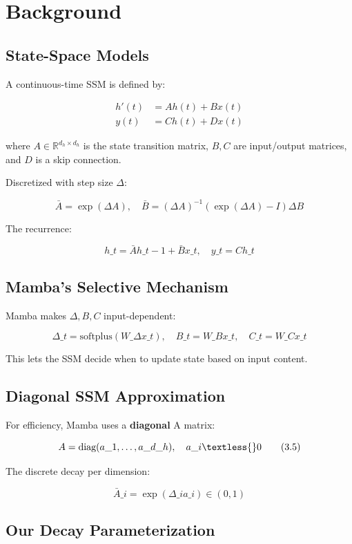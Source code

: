 \section{Background}

\subsection{State-Space Models}

A continuous-time SSM is defined by:

\[
\begin{aligned}
h'(t) &= A h(t) + B x(t) \\
y(t) &= C h(t) + D x(t)
\end{aligned}
\tag{3.1}
\]

where $A \in \mathbb{R}^{d_h \times d_h}$ is the state transition matrix, 
$B, C$ are input/output matrices, and $D$ is a skip connection.

Discretized with step size $\Delta$:

\[
\bar{A} = \exp(\Delta A), \quad \bar{B} = (\Delta A)^{-1} (\exp(\Delta A) - I) \Delta B
\tag{3.2}
\]

The recurrence:

\[
h\_t = \bar{A} h\_{t-1} + \bar{B} x\_t, \quad y\_t = C h\_t
\tag{3.3}
\]

\subsection{Mamba's Selective Mechanism}

Mamba makes $\Delta, B, C$ input-dependent:

\[
\Delta\_t = \text{softplus}(W\_\Delta x\_t), \quad B\_t = W\_B x\_t, \quad C\_t = W\_C x\_t
\tag{3.4}
\]

This lets the SSM decide when to update state based on input content.

\subsection{Diagonal SSM Approximation}

For efficiency, Mamba uses a \textbf{diagonal} A matrix:

\[
A = \text{diag}(a\_1, \dots, a\_{d\_h}), \quad a\_i \textless{} 0
\tag{3.5}
\]

The discrete decay per dimension:

\[
\bar{A}\_i = \exp(\Delta\_i a\_i) \in (0, 1)
\tag{3.6}
\]

\subsection{Our Decay Parameterization}

